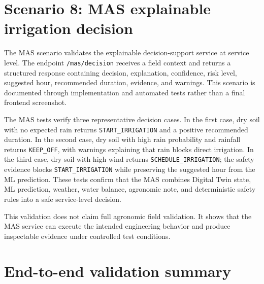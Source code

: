 \section{Scenario 8: MAS explainable irrigation decision}

The MAS scenario validates the explainable decision-support service at service level. The endpoint \texttt{/mas/decision} receives a field context and returns a structured response containing decision, explanation, confidence, risk level, suggested hour, recommended duration, evidence, and warnings. This scenario is documented through implementation and automated tests rather than a final frontend screenshot.

The MAS tests verify three representative decision cases. In the first case, dry soil with no expected rain returns \texttt{START\_IRRIGATION} and a positive recommended duration. In the second case, dry soil with high rain probability and rainfall returns \texttt{KEEP\_OFF}, with warnings explaining that rain blocks direct irrigation. In the third case, dry soil with high wind returns \texttt{SCHEDULE\_IRRIGATION}; the safety evidence blocks \texttt{START\_IRRIGATION} while preserving the suggested hour from the ML prediction. These tests confirm that the MAS combines Digital Twin state, ML prediction, weather, water balance, agronomic note, and deterministic safety rules into a safe service-level decision.

This validation does not claim full agronomic field validation. It shows that the MAS service can execute the intended engineering behavior and produce inspectable evidence under controlled test conditions.

\section{End-to-end validation summary}

